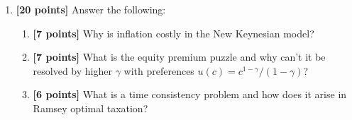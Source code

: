 \documentclass[12pt]{article}
\begin{document}
\begin{enumerate}
\item \textbf{[20 points]} Answer the following:
\begin{enumerate}
\item  \textbf{[7 points]}  Why is inflation costly in the New Keynesian model?
\item   \textbf{[7 points]} What is the equity premium puzzle and why can't it be resolved by higher $\gamma$ with preferences $u(c)=c^{1-\gamma}/(1-\gamma)$?
\item  \textbf{[6 points]} What is a time consistency problem and how does it arise in Ramsey optimal taxation?
\end{enumerate}



\end{enumerate}
\end{document}
